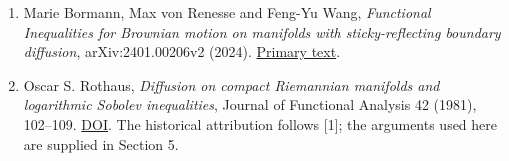 \documentclass[11pt]{article}
\begin{document}
\begin{enumerate}
{  nonlinear elliptic equations, interpolation inequalities, and spectral
  estimates}, Annales de la Faculté des Sciences de Toulouse 26 (2017),
  949--977.
  \href{https://afst.centre-mersenne.org/item/10.5802/afst.1557.pdf}{Primary
  text}.
\item
  Marie Bormann, Max von Renesse and Feng-Yu Wang, \emph{Functional
  Inequalities for Brownian motion on manifolds with sticky-reflecting
  boundary diffusion}, arXiv:2401.00206v2 (2024).
  \href{https://arxiv.org/html/2401.00206v2}{Primary text}.
\item
  Oscar S. Rothaus, \emph{Diffusion on compact Riemannian manifolds and
  logarithmic Sobolev inequalities}, Journal of Functional Analysis 42
  (1981), 102--109.
  \href{https://doi.org/10.1016/0022-1236(81)90049-5}{DOI}. The
  historical attribution follows {[}1{]}; the arguments used here are
  supplied in Section 5.
\end{enumerate}
\end{document}
